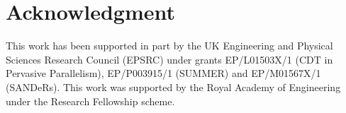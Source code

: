 \documentclass[sigplan,10pt,screen]{acmart}
\begin{document}









%


\section*{Acknowledgment}
This work has been supported in part by the UK Engineering and Physical Sciences Research Council (EPSRC) under grants EP/L01503X/1 (CDT in
Pervasive Parallelism), EP/P003915/1 (SUMMER) and EP/M01567X/1 (SANDeRs).  This work was supported by the Royal Academy of Engineering
under the Research Fellowship scheme.


%

%







%
\end{document}
